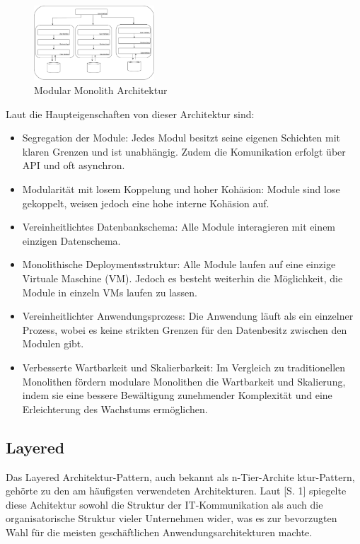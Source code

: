 \documentclass[acmtog]{acmart}
\begin{document}
\begin{figure}[h!]
    \centering
    \includegraphics[width=0.4\textwidth]{images/mono-modular.pdf}
    \caption{Modular Monolith Architektur}
    \label{fig:modular-mono}
\end{figure}

Laut \cite{modular-mono2} die Haupteigenschaften von dieser Architektur sind:
\begin{itemize}
  \item Segregation der Module: Jedes Modul besitzt seine eigenen 
    Schichten mit klaren Grenzen und ist unabhängig. Zudem
    die Komunikation erfolgt über API und oft asynchron.
  \item Modularität mit losem Koppelung und hoher Kohäsion: Module 
    sind lose gekoppelt, weisen jedoch eine hohe interne Kohäsion auf.
  \item Vereinheitlichtes Datenbankschema: Alle Module interagieren 
    mit einem einzigen Datenschema.
  \item Monolithische Deploymentsstruktur: Alle Module laufen auf 
    eine einzige Virtuale Maschine (VM). Jedoch es besteht weiterhin 
    die Möglichkeit, die Module in einzeln VMs laufen zu lassen.
  \item Vereinheitlichter Anwendungsprozess: Die Anwendung läuft 
    als ein einzelner Prozess, wobei es keine strikten Grenzen für 
    den Datenbesitz zwischen den Modulen gibt.
  \item Verbesserte Wartbarkeit und Skalierbarkeit: Im Vergleich zu
    traditionellen Monolithen fördern modulare Monolithen die 
    Wartbarkeit und Skalierung, indem sie eine bessere Bewältigung 
    zunehmender Komplexität und eine Erleichterung des Wachstums ermöglichen.
\end{itemize}



\subsection{Layered}
Das Layered Architektur-Pattern, auch bekannt als n-Tier-Archite
ktur-Pattern, gehörte zu den am häufigsten verwendeten Architekturen. Laut \cite{layered}[S. 1] 
spiegelte diese Achitektur sowohl die Struktur der IT-Kommunikation als auch die organisatorische Struktur vieler Unternehmen wider,
was es zur bevorzugten Wahl für die meisten geschäftlichen Anwendungsarchitekturen machte. 
\end{document}
